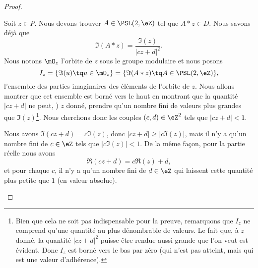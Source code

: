 \begin{proof}
\begin{subproof}
            Soit \( z\in P\). Nous devons trouver \( A\in\PSL(2,\eZ)\) tel que \( A*z\in D\). Nous savons déjà que
            \begin{equation}
                \Im(A*z)=\frac{ \Im(z) }{ | cz+d |^2 }.
            \end{equation}
            Nous notons \( \mO_z\) l'orbite de \( z\) sous le groupe modulaire et nous posons
            \begin{equation}
                I_z=\{ \Im(u)\tq u\in \mO_z \}=\{ \Im(A*z)\tq A\in\PSL(2,\eZ) \},
            \end{equation}
            l'ensemble des parties imaginaires des éléments de l'orbite de \( z\). Nous allons montrer que cet ensemble est borné vers le haut en montrant que la quantité \( | cz+d |\) ne peut, ) \( z\) donné, prendre qu'un nombre fini de valeurs plus grandes que \( \Im(z)\)\footnote{Bien que cela ne soit pas indispensable pour la preuve, remarquons que \( I_z\) ne comprend qu'une quantité au plus dénombrable de valeurs. Le fait que, à \( z\) donné, la quantité \( | cz+d |^2\) puisse être rendue aussi grande que l'on veut est évident. Donc \( I_z\) est borné vers le bas par zéro (qui n'est pas atteint, mais qui est une valeur d'adhérence).}. Nous cherchons donc les couples \( (c,d)\in \eZ^2\) tels que \( | cz+d |<1\).

            Nous avons \( \Im(cz+d)=c\Im(z)\), donc \( | cz+d |\geq |c \Im(z) |\), mais il n'y a qu'un nombre fini de \( c\in \eZ\) tels que \( | c\Im(z) |<1\). De la même façon, pour la partie réelle nous avons
            \begin{equation}
                \Re(cz+d)=c\Re(z)+d,
            \end{equation}
            et pour chaque \( c\),  il n'y a qu'un nombre fini de \( d\in \eZ\) qui laissent cette quantité plus petite que \( 1\) (en valeur absolue).


\end{subproof}
\end{proof}
